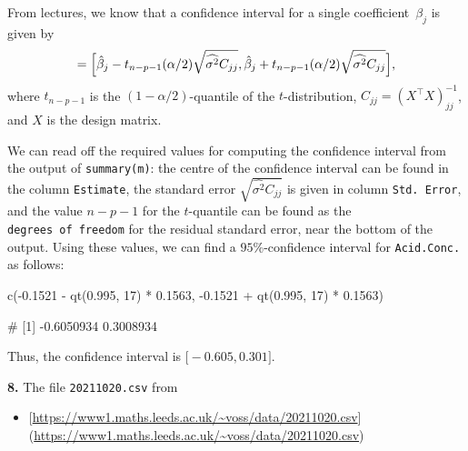 \documentclass[
  a4paper,
]{article}
\newenvironment{Shaded}{\begin{snugshade}}{\end{snugshade}}
\newcommand{\DecValTok}[1]{\textcolor[rgb]{0.00,0.00,0.81}{#1}}
\newcommand{\FloatTok}[1]{\textcolor[rgb]{0.00,0.00,0.81}{#1}}
\newcommand{\FunctionTok}[1]{\textcolor[rgb]{0.00,0.00,0.00}{#1}}
\newcommand{\NormalTok}[1]{#1}
\newcommand{\SpecialCharTok}[1]{\textcolor[rgb]{0.00,0.00,0.00}{#1}}
\providecommand{\tightlist}{%
  \setlength{\itemsep}{0pt}\setlength{\parskip}{0pt}}
\theoremstyle{definition}
\theoremstyle{definition}
\theoremstyle{definition}
\theoremstyle{definition}
\theoremstyle{remark}
\begin{document}
\begin{myanswers}
From lectures, we know that a confidence interval for a single
coefficient~\(\beta_j\) is given by
\begin{equation*}
  [U, V]
  = \Bigl[ \hat\beta_j - t_{n-p-1}(\alpha/2) \sqrt{\widehat{\sigma^2} C_{jj}},
        \hat\beta_j + t_{n-p-1}(\alpha/2) \sqrt{\widehat{\sigma^2} C_{jj}} \Bigr],
\end{equation*}
where \(t_{n-p-1}\) is the \((1-\alpha/2)\)-quantile of the \(t\)-distribution,
\(C_{jj} = (X^\top X)^{-1}_{jj}\), and \(X\) is the design matrix.

We can read off the required values for computing the confidence
interval from the output of \texttt{summary(m)}: the centre of the
confidence interval can be found in the column \texttt{Estimate}, the
standard error \(\sqrt{\widehat{\sigma^2} C_{jj}}\) is given in column
\texttt{Std.\ Error}, and the value \(n-p-1\) for the \(t\)-quantile can be
found as the \texttt{degrees\ of\ freedom} for the residual standard error,
near the bottom of the output. Using these values, we can find a
\(95\%\)-confidence interval for \texttt{Acid.Conc.} as
follows:

\begin{Shaded}
\begin{Highlighting}[]
\FunctionTok{c}\NormalTok{(}\SpecialCharTok{{-}}\FloatTok{0.1521} \SpecialCharTok{{-}} \FunctionTok{qt}\NormalTok{(}\FloatTok{0.995}\NormalTok{, }\DecValTok{17}\NormalTok{) }\SpecialCharTok{*} \FloatTok{0.1563}\NormalTok{, }\SpecialCharTok{{-}}\FloatTok{0.1521} \SpecialCharTok{+} \FunctionTok{qt}\NormalTok{(}\FloatTok{0.995}\NormalTok{, }\DecValTok{17}\NormalTok{) }\SpecialCharTok{*} \FloatTok{0.1563}\NormalTok{)}
\end{Highlighting}
\end{Shaded}

\begin{Shaded}
\begin{Highlighting}[]
\NormalTok{\# [1] {-}0.6050934  0.3008934}
\end{Highlighting}
\end{Shaded}

Thus, the confidence interval is \(\bigl[ -0.605, 0.301 \bigr]\).

\end{myanswers}

\textbf{8.} The file \texttt{20211020.csv} from

\begin{itemize}
\tightlist
\item
  {[}\url{https://www1.maths.leeds.ac.uk/~voss/data/20211020.csv}{]}(\url{https://www1.maths.leeds.ac.uk/~voss/data/20211020.csv})
\end{itemize}
\end{document}
